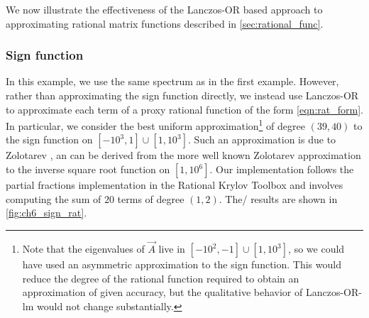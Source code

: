 We now illustrate the effectiveness of the Lanczos-OR based approach to approximating rational matrix functions described in \cref{sec:rational_func}.


\subsubsection{Sign function}

In this example, we use the same spectrum as in the first example.
However, rather than approximating the sign function directly, we instead use Lanczos-OR to approximate each term of a proxy rational function of the form \cref{eqn:rat_form}.
In particular, we consider the best uniform approximation\footnote{Note that the eigenvalues of $\vec{A}$ live in $[-10^2,-1]\cup[1,10^3]$, so we could have used an asymmetric approximation to the sign function.
This would reduce the degree of the rational function required to obtain an approximation of given accuracy, but the qualitative behavior of Lanczos-OR-lm would not change substantially.} of degree $(39,40)$ to the sign function on $[-10^3,1]\cup[1,10^3]$.
Such an approximation is due to Zolotarev \cite{zolotarev_77}, an can be derived from the more well known Zolotarev approximation to the inverse square root function on $[1,10^6]$.
Our implementation follows the partial fractions implementation in the Rational Krylov Toolbox \cite{berljafa_elsworth_guttel_20} and involves computing the sum of $20$ terms of degree $(1,2)$.
The/ results are shown in \cref{fig:ch6_sign_rat}.

